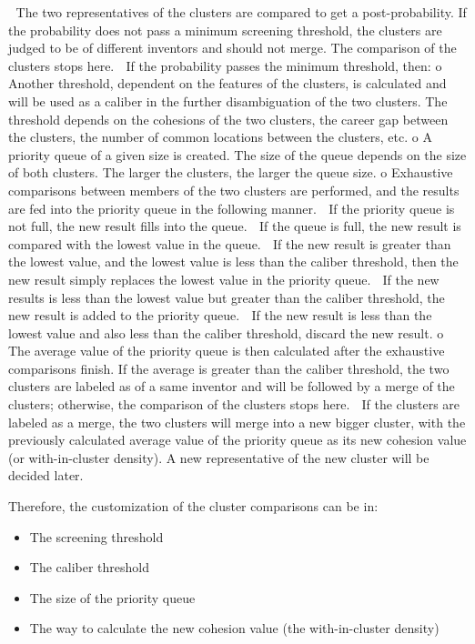 \documentclass{article}
\begin{document}
 The two representatives of the clusters are compared to get a post-probability. If the
probability does not pass a minimum screening threshold, the clusters are judged to be of
different inventors and should not merge. The comparison of the clusters stops here.
 If the probability passes the minimum threshold, then:
o Another threshold, dependent on the features of the clusters, is calculated and will be
used as a caliber in the further disambiguation of the two clusters. The threshold
depends on the cohesions of the two clusters, the career gap between the clusters, the
number of common locations between the clusters, etc.
o A priority queue of a given size is created. The size of the queue depends on the size of
both clusters. The larger the clusters, the larger the queue size.
o Exhaustive comparisons between members of the two clusters are performed, and the
results are fed into the priority queue in the following manner.
 If the priority queue is not full, the new result fills into the queue.
 If the queue is full, the new result is compared with the lowest value in the
queue.
 If the new result is greater than the lowest value, and the lowest
value is less than the caliber threshold, then the new result simply
replaces the lowest value in the priority queue.
 If the new results is less than the lowest value but greater than the
caliber threshold, the new result is added to the priority queue.
 If the new result is less than the lowest value and also less than the
caliber threshold, discard the new result.
o The average value of the priority queue is then calculated after the exhaustive
comparisons finish. If the average is greater than the caliber threshold, the two
clusters are labeled as of a same inventor and will be followed by a merge of the
clusters; otherwise, the comparison of the clusters stops here.
 If the clusters are labeled as a merge, the two clusters will merge into a new bigger cluster,
with the previously calculated average value of the priority queue as its new cohesion value
(or with-in-cluster density). A new representative of the new cluster will be decided later.


Therefore, the customization of the cluster comparisons can be in:

\begin{itemize}

\item The screening threshold

\item The caliber threshold

\item The size of the priority queue

\item The way to calculate the new cohesion value (the with-in-cluster density)

\end{itemize}
\end{document}

